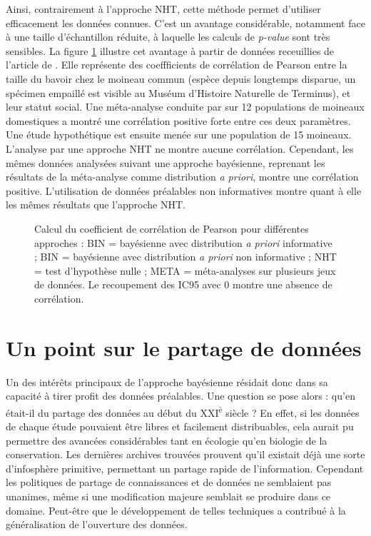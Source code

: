 Ainsi, contrairement à l'approche NHT, cette méthode permet d'utiliser
efficacement les données connues.
C'est un avantage considérable, notamment face à une taille d'échantillon
réduite, à laquelle les calculs de \emph{p-value} sont très sensibles.
La figure \ref{fig:pearson} illustre cet avantage à partir de données
receuillies de l'article de \citet{garamszegi2009}.
Elle représente des coeffficients de corrélation de Pearson entre la taille du
bavoir chez le moineau commun (espèce depuis longtemps disparue, un spécimen
empaillé est visible au Muséum d'Histoire Naturelle de Terminus), et leur statut
social.
Une méta-analyse conduite par \citet{nakagawa2007} sur 12 populations de
moineaux domestiques a montré une corrélation positive forte entre ces deux
paramètres.
Une étude hypothétique est ensuite menée sur une population de 15 moineaux.
L'analyse par une approche NHT ne montre aucune corrélation.
Cependant, les mêmes données analysées suivant une approche bayésienne,
reprenant les résultats de la méta-analyse comme distribution \emph{a priori},
montre une corrélation positive.
L'utilisation de données préalables non informatives montre quant à elle les
mêmes résultats que l'approche NHT.

\begin{figure}[t]
  {\graphfont\centering}
  \caption{Calcul du coefficient de corrélation de Pearson pour différentes
    approches :
    BIN = bayésienne avec distribution \textit{a priori} informative ;
    BIN = bayésienne avec distribution \textit{a priori} non informative ;
    NHT = test d'hypothèse nulle ;
    META = méta-analyses sur plusieurs jeux de données.
    Le recoupement des IC95 avec 0 montre une absence de corrélation.
  }
  \label{fig:pearson}
\end{figure}


\section{Un point sur le partage de données}

Un des intérêts principaux de l'approche bayésienne résidait donc dans sa
capacité à tirer profit des données préalables.
Une question se pose alors : qu'en était-il du partage des données au début du
XXI\textsuperscript{è} siècle ?
En effet, si les données de chaque étude pouvaient être libres et facilement
distribuables, cela aurait pu permettre des avancées considérables tant en
écologie qu'en biologie de la conservation.
Les dernières archives trouvées prouvent qu'il existait déjà une sorte
d'infosphère primitive, permettant un partage rapide de l'information.
Cependant les politiques de partage de connaissances et de données ne semblaient
pas unanimes, même si une modification majeure semblait se produire dans ce
domaine.
Peut-être que le développement de telles techniques a contribué à la
généralisation de l'ouverture des données.


\begin{scriptsize}
  
\end{scriptsize}


